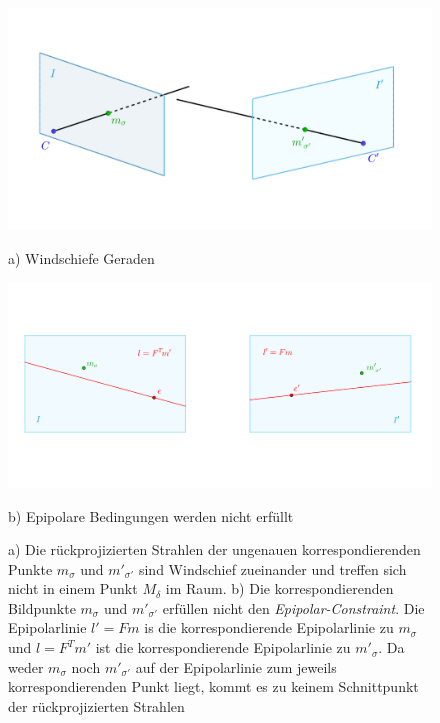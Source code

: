 \begin{figure}[!htb]
	\includegraphics[width=\linewidth]{images/problemTriangulation_beschriftet.png}
	\caption[Windschiefe Geraden]{a) Windschiefe Geraden}
	\label{fig:ProblemTraingulation}
	\endminipage\hfill
	\includegraphics[width=\linewidth]{images/SampsAppx.png}
	\caption[Epipolare Bedingung wird nicht erfüllt]{b) Epipolare Bedingungen werden nicht erfüllt}
	\label{fig:lFm}
	\endminipage\hfill
	\caption[Problemstellung für die Triangulation im reellen Beispiel]{ a) Die rückprojizierten Strahlen der ungenauen korrespondierenden Punkte $m_\sigma$ und $m'_{\sigma'}$ sind Windschief zueinander und treffen sich nicht in einem Punkt $M_\delta$ im Raum. b) Die korrespondierenden Bildpunkte $m_\sigma$ und $m'_{\sigma'}$ erfüllen nicht den \textit{Epipolar-Constraint}. Die Epipolarlinie $l' = Fm$ is die korrespondierende Epipolarlinie zu $m_\sigma$ und $l = F^Tm'$ ist die korrespondierende Epipolarlinie zu $m'_{\sigma}$. Da weder $m_\sigma$ noch $m'_{\sigma'}$ auf der Epipolarlinie zum jeweils korrespondierenden Punkt liegt, kommt es zu keinem Schnittpunkt der rückprojizierten Strahlen}
\end{figure}

